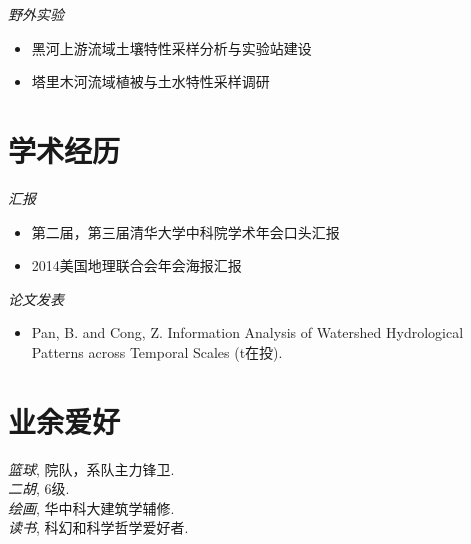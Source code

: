\documentclass[margin]{res}
\begin{document}
\begin{CJK}{UTF8}{gkai}
\begin{resume}
\begin{itemize}
                 \end{itemize} 
                 {\sl 野外实验}  \\
                 \begin{itemize}  \itemsep -2pt %
                 \item 黑河上游流域土壤特性采样分析与实验站建设 
                 \item 塔里木河流域植被与土水特性采样调研         
                 \end{itemize} 
                 \section{学术经历}  
 {\it 汇报\\} 
 \begin{itemize}
 \item 第二届，第三届清华大学中科院学术年会口头汇报 
 \item 2014美国地理联合会年会海报汇报
 \end{itemize}
  {\it 论文发表\\} 
  \begin{itemize}
  \item Pan, B. and Cong, Z.  Information Analysis of Watershed Hydrological Patterns across Temporal Scales (t在投). 
  \end{itemize}
 

\section{业余爱好}             

            {\it 篮球}, 院队，系队主力锋卫. \\
            {\it 二胡}, 6级.\\
            {\it 绘画}, 华中科大建筑学辅修. \\
            {\it 读书}, 科幻和科学哲学爱好者.
 

\end{resume}
\end{CJK}
\end{document}
